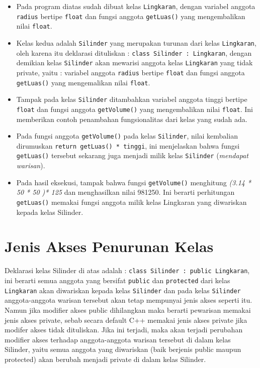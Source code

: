 \begin{itemize}
\tightlist
\item
  Pada program diatas sudah dibuat kelas \texttt{Lingkaran}, dengan
  variabel anggota \texttt{radius} bertipe \texttt{float} dan fungsi
  anggota \texttt{getLuas()} yang mengembalikan nilai \texttt{float}.
\item
  Kelas kedua adalah \texttt{Silinder} yang merupakan turunan dari kelas
  \texttt{Lingkaran}, oleh karena itu deklarasi dituliskan :
  \texttt{class\ Silinder\ :\ Lingkaran}, dengan demikian kelas
  \texttt{Silinder} akan mewarisi anggota kelas \texttt{Lingkaran} yang
  tidak private, yaitu : variabel anggota \texttt{radius} bertipe
  \texttt{float} dan fungsi anggota \texttt{getLuas()} yang mengemalikan
  nilai \texttt{float}.
\item
  Tampak pada kelas \texttt{Silinder} ditambahkan variabel anggota
  tinggi bertipe \texttt{float} dan fungsi anggota \texttt{getVolume()}
  yang mengembalikan nilai \texttt{float}. Ini memberikan contoh
  penambahan fungsionalitas dari kelas yang sudah ada.
\item
  Pada fungsi anggota \texttt{getVolume()} pada kelas \texttt{Silinder},
  nilai kembalian dirumuskan \texttt{return\ getLuas()\ *\ tinggi}, ini
  menjelaskan bahwa fungsi \texttt{getLuas()} tersebut sekarang juga
  menjadi milik kelas \texttt{Silinder} (\emph{mendapat warisan}).
\item
  Pada hasil eksekusi, tampak bahwa fungsi \texttt{getVolume()}
  menghitung \emph{(3.14 * 50 * 50 )* 125} dan menghasilkan nilai
  981250. Ini berarti perhitungan \texttt{getLuas()} memakai fungsi
  anggota milik kelas Lingkaran yang diwariskan kepada kelas Silinder.
\end{itemize}

\section{Jenis Akses Penurunan
Kelas}\label{jenis-akses-penurunan-kelas}

Deklarasi kelas Silinder di atas adalah :
\texttt{class\ Silinder\ :\ public\ Lingkaran}, ini berarti semua
anggota yang bersifat \texttt{public} dan \texttt{protected} dari kelas
\texttt{Lingkaran} akan diwariskan kepada kelas \texttt{Silinder} dan
pada kelas \texttt{Silinder} anggota-anggota warisan tersebut akan tetap
mempunyai jenis akses seperti itu. Namun jika modifier akses public
dihilangkan maka berarti pewarisan memakai jenis akses private, sebab
secara default C++ memakai jenis akses private jika modifer akses tidak
dituliskan. Jika ini terjadi, maka akan terjadi perubahan modifier akses
terhadap anggota-anggota warisan tersebut di dalam kelas Silinder, yaitu
semua anggota yang diwariskan (baik berjenis public maupun protected)
akan berubah menjadi private di dalam kelas Silinder.

